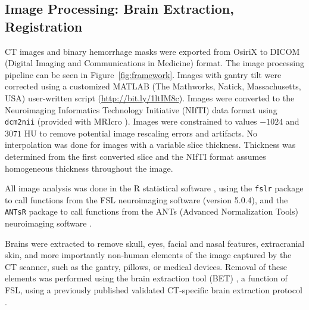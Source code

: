\documentclass{elsarticle_nonatbib}\usepackage[]{graphicx}\usepackage[]{color}
\newcommand{\pkg}[1]{\texttt{#1}}
\newcommand{\code}[1]{\texttt{#1}}
\begin{document}
\subsection{Image Processing: Brain Extraction, Registration}
CT images and binary hemorrhage masks were exported from OsiriX to DICOM (Digital Imaging and Communications in Medicine) format.   The image processing pipeline can be seen in Figure~\ref{fig:framework}.   Images with gantry tilt were corrected using a customized MATLAB (The Mathworks, Natick, Massachusetts, USA) user-written script ({\scriptsize \url{http://bit.ly/1ltIM8c}}). Images were converted to the Neuroimaging Informatics Technology Initiative (NIfTI) data format using \code{dcm2nii} (provided with MRIcro \citep{rorden_stereotaxic_2000}).  Images were constrained to values $-1024$ and $3071$ HU to remove potential image rescaling errors and artifacts.   No interpolation was done for images with a variable slice thickness. Thickness was determined from the first converted slice and the NIfTI format assumes homogeneous thickness throughout the image.  

All image analysis was done in the R statistical software \citep{RCORE}, using the \pkg{fslr} \citep{muschelli2015fslr} package to call functions from the FSL \citep{jenkinson_fsl_2012} neuroimaging software (version 5.0.4), and the \pkg{ANTsR} package to call functions from the ANTs (Advanced Normalization Tools) neuroimaging software \citep{avants_reproducible_2011}.

Brains were extracted to remove skull, eyes, facial and nasal features, extracranial skin, and more importantly non-human elements of the image captured by the CT scanner, such as the gantry, pillows, or medical devices.  Removal of these elements was performed using the brain extraction tool (BET) \citep{smith_fast_2002}, a function of FSL, using a previously published validated CT-specific brain extraction protocol \citep{muschelli_validated_2015}.  
\end{document}
